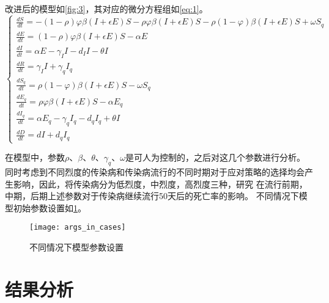 \documentclass[withoutpreface,bwprint]{cumcmthesis}
\begin{document}
改进后的模型如\cref{fig:3}，其对应的微分方程组如\cref{eq:1}。
\begin{equation}
    \begin{cases}
        \frac{dS}{dt}=-(1-\rho)\varphi\beta(I+\epsilon E)S-\rho\varphi\beta(I+\epsilon E)S-\rho(1-\varphi)\beta(I+\epsilon E)S+\omega S_q \\
        \frac{dE}{dt}=(1-\rho)\varphi\beta(I+\epsilon E)S-\alpha E \\
        \frac{dI}{dt}=\alpha E-\gamma_II-d_II-\theta I\\
        \frac{dR}{dt}=\gamma_II+\gamma_qI_q\\
        \frac{dS_q}{dt}=\rho(1-\varphi)\beta(I+\epsilon E)S-\omega S_q\\
        \frac{dE_q}{dt}=\rho\varphi\beta(I+\epsilon E)S-\alpha E_q \\
        \frac{dI_q}{dt}=\alpha E_q-\gamma_qI_q-d_qI_q+\theta I \\
        \frac{dD}{dt}=dI+d_qI_q
    \end{cases}
    \label{eq:1}
\end{equation}

在模型中，参数$\rho$、$\beta$、$\theta$、$\gamma_q$、$\omega$是可人为控制的，之后对这几个参数进行分析。
同时考虑到不同烈度的传染病和传染病流行的不同时期对于应对策略的选择均会产生影响，因此，将传染病分为低烈度，中烈度，高烈度三种，研究
在流行前期，中期，后期上述参数对于传染病继续流行50天后的死亡率的影响。
不同情况下模型初始参数设置如\cref{fig:5}。

\begin{figure}[!h]
    \centering
    \texttt{[image: args\_in\_cases]}
    \caption{不同情况下模型参数设置}
    \label{fig:5}
\end{figure}


\section{结果分析}
\end{document}
